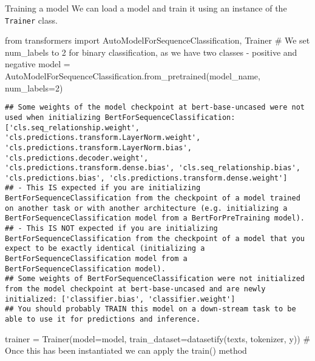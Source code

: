 \documentclass[
  10pt,
  ignorenonframetext,
  aspectratio=169]{beamer}
\newenvironment{Shaded}{\begin{snugshade}}{\end{snugshade}}
\newcommand{\CommentTok}[1]{\textcolor[rgb]{0.50,0.62,0.50}{#1}}
\newcommand{\DecValTok}[1]{\textcolor[rgb]{0.86,0.86,0.80}{#1}}
\newcommand{\ImportTok}[1]{\textcolor[rgb]{0.80,0.80,0.80}{#1}}
\newcommand{\NormalTok}[1]{\textcolor[rgb]{0.80,0.80,0.80}{#1}}
\newcommand{\OperatorTok}[1]{\textcolor[rgb]{0.94,0.94,0.82}{#1}}
\begin{document}
\begin{frame}[fragile]{Training a model}
\protect\hypertarget{training-a-model}{}
We can load a model and train it using an instance of the
\texttt{Trainer} class.

\medskip
\scriptsize

\begin{Shaded}
\begin{Highlighting}[]
\ImportTok{from}\NormalTok{ transformers }\ImportTok{import}\NormalTok{ AutoModelForSequenceClassification, Trainer}
\CommentTok{\# We set num\_labels to 2 for binary classification, as we have two classes {-} positive and negative}
\NormalTok{model }\OperatorTok{=}\NormalTok{ AutoModelForSequenceClassification.from\_pretrained(model\_name, num\_labels}\OperatorTok{=}\DecValTok{2}\NormalTok{)}
\end{Highlighting}
\end{Shaded}

\begin{verbatim}
## Some weights of the model checkpoint at bert-base-uncased were not used when initializing BertForSequenceClassification: ['cls.seq_relationship.weight', 'cls.predictions.transform.LayerNorm.weight', 'cls.predictions.transform.LayerNorm.bias', 'cls.predictions.decoder.weight', 'cls.predictions.transform.dense.bias', 'cls.seq_relationship.bias', 'cls.predictions.bias', 'cls.predictions.transform.dense.weight']
## - This IS expected if you are initializing BertForSequenceClassification from the checkpoint of a model trained on another task or with another architecture (e.g. initializing a BertForSequenceClassification model from a BertForPreTraining model).
## - This IS NOT expected if you are initializing BertForSequenceClassification from the checkpoint of a model that you expect to be exactly identical (initializing a BertForSequenceClassification model from a BertForSequenceClassification model).
## Some weights of BertForSequenceClassification were not initialized from the model checkpoint at bert-base-uncased and are newly initialized: ['classifier.bias', 'classifier.weight']
## You should probably TRAIN this model on a down-stream task to be able to use it for predictions and inference.
\end{verbatim}

\begin{Shaded}
\begin{Highlighting}[]
\NormalTok{trainer }\OperatorTok{=}\NormalTok{ Trainer(model}\OperatorTok{=}\NormalTok{model, train\_dataset}\OperatorTok{=}\NormalTok{datasetify(texts, tokenizer, y))}
\CommentTok{\# Once this has been instantiated we can apply the train() method}
\end{Highlighting}
\end{Shaded}


\end{frame}
\end{document}
